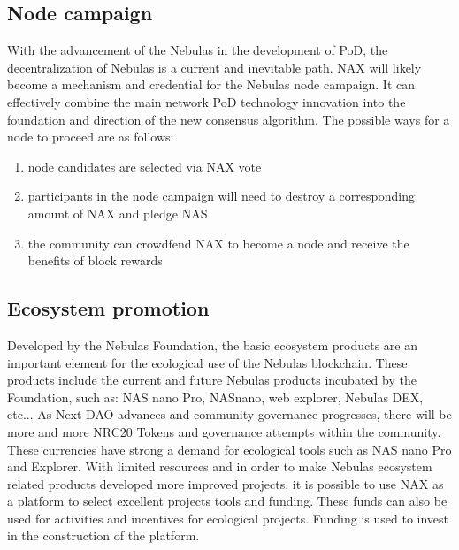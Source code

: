 \subsection{Node campaign}
With the advancement of the Nebulas in the development of PoD, the decentralization of Nebulas is a current and inevitable path. NAX will likely become a mechanism and credential for the Nebulas node campaign. It can effectively combine the main network PoD technology innovation into the foundation and direction of the new consensus algorithm. The possible ways for a node to proceed are as follows:
\begin{enumerate}[\hspace{1cm}(a)]
  \item node candidates are selected via NAX vote
  \item participants in the node campaign will need to destroy a corresponding amount of NAX and pledge NAS
  \item the community can crowdfend NAX to become a node and receive the benefits of block rewards
\end{enumerate}

\subsection{Ecosystem promotion}
Developed by the Nebulas Foundation, the basic ecosystem products are an important  element for the ecological use of the Nebulas blockchain. These products include the current and future Nebulas products incubated by the Foundation, such as: NAS nano Pro, NASnano, web explorer, Nebulas DEX, etc... As Next DAO advances and community governance progresses, there will be more and more NRC20 Tokens and governance attempts within the community. These currencies have strong a demand for ecological tools such as NAS nano Pro and Explorer. With limited resources and in order to make Nebulas ecosystem related products developed more improved projects, it is possible to use NAX as a platform to select excellent projects tools and funding. These funds can also be used for activities and incentives for ecological projects. Funding is used to invest in the construction of the platform.
